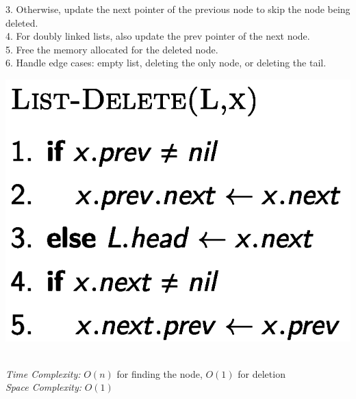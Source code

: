 {\begin{minipage}[t]{0.41\textwidth}
\begin{minipage}[htp]{0.65\textwidth}
        3. Otherwise, update the next pointer of the previous node to skip the node being deleted.\\
        4. For doubly linked lists, also update the prev pointer of the next node.\\
        5. Free the memory allocated for the deleted node.\\
        6. Handle edge cases: empty list, deleting the only node, or deleting the tail.
    \end{minipage}
    \begin{minipage}[htp]{0.3\textwidth}
        \begin{center}
            \includegraphics[width=0.9\linewidth]{images/list-delete.png}
        \end{center}
    \end{minipage}\\
    \textit{Time Complexity:} \(O(n)\) for finding the node, \(O(1)\) for deletion \\ \textit{Space Complexity:} \(O(1)\)
\end{minipage}} 